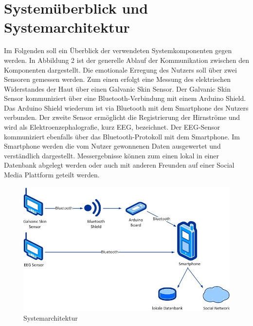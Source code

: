 \documentclass[10pt, a4paper, oneside, titlepage]{scrartcl} %
\begin{document}
   \section{Systemüberblick und Systemarchitektur}
   Im Folgenden soll ein Überblick der verwendeten Systemkomponenten gegen werden. In Abbildung 2 ist der generelle Ablauf der Kommunikation zwischen den Komponenten dargestellt. Die emotionale Erregung des Nutzers soll über zwei Sensoren gemessen werden. Zum einen erfolgt eine Messung des elektrischen Widerstandes der Haut über einen Galvanic Skin Sensor. Der Galvanic Skin Sensor kommuniziert über eine Bluetooth-Verbindung mit einem Arduino Shield. Das Arduino Shield wiederum ist via Bluetooth mit dem Smartphone des Nutzers verbunden. Der zweite Sensor ermöglicht die Registrierung der Hirnströme und wird als  Elektroenzephalografie, kurz EEG, bezeichnet. Der EEG-Sensor kommuniziert ebenfalls über das Bluetooth-Protokoll mit dem Smartphone. Im Smartphone werden die vom Nutzer gewonnenen Daten ausgewertet und verständlich dargestellt. Messergebnisse können zum einen lokal in einer Datenbank abgelegt werden oder auch mit anderen Freunden auf einer Social Media Plattform geteilt werden.
   	\begin{figure}[ht!]
		\begin{center}
			\includegraphics[scale=0.6]{systemarchitektur_01.jpg}
		\end{center}
		\caption[Systemarchitektur]{Systemarchitektur}
		\label{fig:system1}
	\end{figure}
\end{document}

